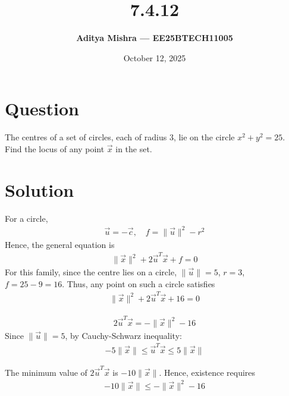 \documentclass[a4paper,12pt]{article}
\title{\textbf{7.4.12}}
\author{\textbf{Aditya Mishra — EE25BTECH11005}}
\date{October 12, 2025}
\begin{document}
\maketitle

\section*{Question}
The centres of a set of circles, each of radius \(3\), lie on the circle \(x^2 + y^2 = 25\).  
Find the locus of any point \(\vec{x}\) in the set.

\section*{Solution}

For a circle,
\begin{align}
\vec{u} = -\vec{c}, \quad f = \|\vec{u}\|^2 - r^2
\end{align}
Hence, the general equation is
\begin{align}
\|\vec{x}\|^2 + 2\vec{u}^T\vec{x} + f = 0
\end{align}
For this family, since the centre lies on a circle, \(\|\vec{u}\|=5\), \(r=3\), \(f=25-9=16\). Thus, any point on such a circle satisfies
\begin{align}
\|\vec{x}\|^2 + 2\vec{u}^T\vec{x} + 16 = 0
\end{align}

\begin{align}
2\vec{u}^T\vec{x} = -\|\vec{x}\|^2 - 16
\end{align}
Since \(\|\vec{u}\| = 5\), by Cauchy-Schwarz inequality:
\begin{align}
-5\|\vec{x}\| \le \vec{u}^T\vec{x} \le 5\|\vec{x}\|
\end{align}

The minimum value of \(2\vec{u}^T\vec{x}\) is \(-10\|\vec{x}\|\).  
Hence, existence requires
\begin{align}
-10\|\vec{x}\| \le -\|\vec{x}\|^2 - 16
\end{align}
\end{document}
